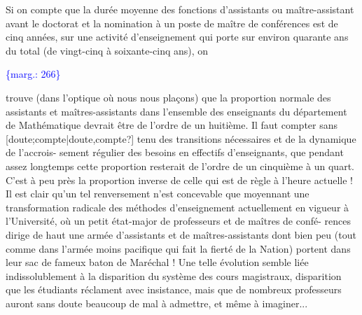 \documentclass[11pt]{article}
\newcommand{\scanpage}[1]{\par\bigskip\noindent{\small\sffamily[scan #1]}\par}
\newcommand{\mspage}[1]{{\small\sffamily[p.\,#1]}}
\newcommand{\margin}[1]{\textcolor{blue}{\{\textsf{marg.:} #1\}}}
\newcommand{\unsure}[1]{[#1?]}
\begin{document}
Si on compte que la durée moyenne des fonctions d'assistants ou
maître-assistant avant le doctorat et la nomination à un poste de maître de
conférences est de cinq années, sur une activité d'enseignement qui porte
sur environ quarante ans du total (de vingt-cinq à soixante-cinq ans), on

\margin{266}

\clearpage
\scanpage{119/267}
\mspage{14}

trouve (dans l'optique où nous nous plaçons) que la proportion normale des
assistants et maîtres-assistants dans l'ensemble des enseignants du département
de Mathématique devrait être de l'ordre de un huitième. Il faut compter sans
\unsure{doute;compte|doute,compte} tenu des transitions nécessaires et de la dynamique de l'accrois-%
sement régulier des besoins en effectifs d'enseignants, que pendant assez
longtemps cette proportion resterait de l'ordre de un cinquième à un quart.
C'est à peu près la proportion inverse de celle qui est de règle à l'heure
actuelle ! Il est clair qu'un tel renversement n'est concevable que moyennant
une transformation radicale des méthodes d'enseignement actuellement en vigueur
à l'Université, où un petit état-major de professeurs et de maîtres de confé-%
rences dirige de haut une armée d'assistants et de maîtres-assistants dont
bien peu (tout comme dans l'armée moins pacifique qui fait la fierté de la
Nation) portent dans leur sac de fameux baton de Maréchal ! Une telle évolution
semble liée indissolublement à la disparition du système des cours magistraux,
disparition que les étudiants réclament avec insistance, mais que de nombreux
professeurs auront sans doute beaucoup de mal à admettre, et même à imaginer...
\end{document}
